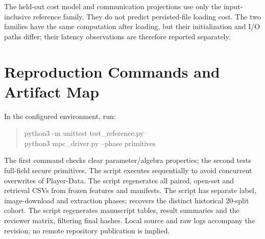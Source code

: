 \documentclass[journal,onecolumn]{IEEEtran}
\begin{document}
The held-out cost model and communication projections use only the input-inclusive reference family. They do not predict persisted-file loading cost. The two families have the same computation after loading, but their initialization and I/O paths differ; their latency observations are therefore reported separately.



\section{Reproduction Commands and Artifact Map}
In the configured environment, run:
\begin{quote}\ttfamily
python3 -m unittest test\_reference.py\\
python3 mpc\_driver.py --phase primitives
\end{quote}
The first command checks clear parameter/algebra properties; the second tests full-field secure primitives. The script  executes sequentially to avoid concurrent overwrites of Player-Data. The script  regenerates all paired, open-set and retrieval CSVs from frozen features and manifests. The script  has separate label, image-download and extraction phases;  recovers the distinct historical 20-split cohort. The script  regenerates manuscript tables, result summaries and the reviewer matrix, filtering final hashes. Local source and raw logs accompany the revision; no remote repository publication is implied.


\end{document}
